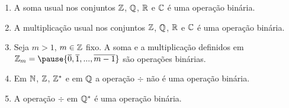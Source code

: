 \documentclass{beamer}
\begin{document}
    \begin{frame}
        \begin{exemplos}
            \begin{enumerate}[label={\arabic*})]
                \item A soma usual \pause nos conjuntos $\mathbb{Z}$, \pause $\mathbb{Q}$, \pause $\mathbb{R}$ \pause e $\mathbb{C}$ \pause
                    é uma operação binária.\pause

                \vspace{.3cm}

                \item A multiplicação usual \pause nos conjuntos $\mathbb{Z}$, \pause $\mathbb{Q}$, \pause $\mathbb{R}$ \pause e
                    $\mathbb{C}$ é uma operação binária.\pause

                \vspace{.3cm}

                \item Seja $m > 1$, \pause $m \in \mathbb{Z}$ fixo. \pause A soma \pause e a multiplicação definidos em
                    $\z_m = \pause \{\overline{0}, \overline{1}, ..., \overline{m-1}\}$ \pause são operações
                    binárias.\pause

                \vspace{.3cm}

                \item Em $\mathbb{N}$, \pause $\mathbb{Z}$, \pause $\mathbb{Z}^{*}$ \pause e em $\mathbb{Q}$ \pause a operação $\div$
                    \pause não é uma operação binária.

                \vspace{.3cm}

                \item A operação $\div$ \pause em $\mathbb{Q}^{*}$ \pause é uma operação binária.\pause

                \vspace{.3cm}

            \end{enumerate}
        \end{exemplos}
    \end{frame}
\end{document}
